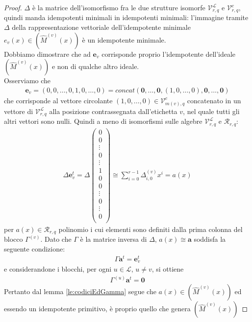 \begin{proof}
   $\Delta$ è la matrice dell'isomorfismo fra le due strutture isomorfe $\mathcal{V}_{r, q}^{\mathscr{L}}$ e $\mathcal{V}_{r, q}^{c}$, quindi manda idempotenti minimali in idempotenti minimali: l'immagine tramite $\Delta$ della rappresentazione vettoriale dell'idempotente minimale $e_{v}(x) \in (\hat{M}^{(v)}(x))$ è un idempotente minimale.\\
   Dobbiamo dimostrare che ad $\mathbf{e}_{v}$ corrisponde proprio l'idempotente dell'ideale $(\hat{M}^{(v)}(x))$ e non di qualche altro ideale.\\
   Osserviamo che
   \begin{align*}
      \mathbf{e}_{v} = (0,0,\dots, 0, 1, 0 , \dots, 0)
                     = concat(\mathbf{0}, \dots ,\mathbf{0},(1,0,\dots,0), \mathbf{0}, \dots ,\mathbf{0})
   \end{align*}
   che corrisponde al vettore circolante $(1,0,\dots,0) \in \mathcal{V}_{m(v), q}^{c}$ concatenato in un vettore di $\mathcal{V}_{r, q}^{\mathscr{L}}$ alla posizione contrassegnata dall'etichetta $v$, nel quale tutti gli altri vettori sono nulli.
   Quindi a meno di isomorfismi sulle algebre $\mathcal{V}_{r, q}^{\mathscr{L}}$ e $\mathcal{R}_{r,q}$:
   \begin{align*}
      \Delta \mathbf{e}_{v}^{t} =
      \Delta
      \left(
      \begin{array} { c }
      0  \\
      \hline
      0   \\
      \vdots  \\
      0   \\
      \hline
      \vdots \\
      \hline
      1   \\
      0   \\
      0  \\
      \hline
      \vdots \\
      \hline
      0   \\
      \vdots  \\
      0   \\
      \end{array}
      \right)
      \cong
      \sum_{i=0}^{r-1} \Delta_{i,0}^{(v)} x^{i} = a(x)
   \end{align*}
    per $a(x) \in \mathcal{R}_{r,q}$ polinomio i cui elementi sono definiti dalla prima colonna del blocco $\Gamma^{(v)}$. Dato che $\Gamma$ è la matrice inversa di $\Delta$, $a(x)\cong \mathbf{a}$ soddisfa la seguente condizione:
    \begin{align*}
       \Gamma \mathbf{a}^{t} = \mathbf{e}_{v}^{t}
    \end{align*}
    e considerandone i blocchi, per ogni $u \in \mathscr{L}$, $u \neq v$, si ottiene
    \begin{align*}
       \Gamma^{(u)} \mathbf{a}^{t} = \mathbf{0}
    \end{align*}
    Pertanto dal lemma \ref{le:codiciEdGamma} segue che $a(x) \in (\hat{M}^{(v)}(x))$ ed essendo un idempotente primitivo, è proprio quello che genera $ (\hat{M}^{(v)}(x))$
\end{proof}

